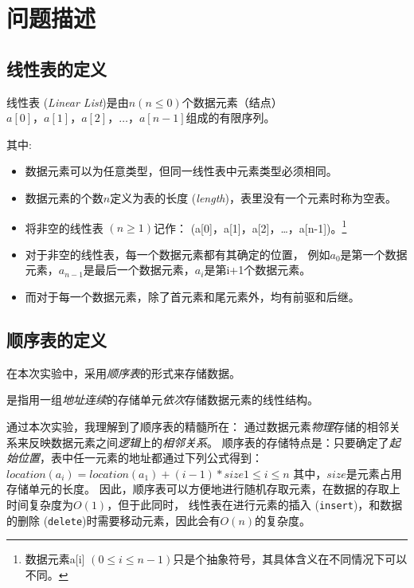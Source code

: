 \section{问题描述}
\subsection{线性表的定义}
\begin{definition}\label{def:linear list}
    线性表 (\emph{Linear List})是由$n (n \le 0)$个数据元素（结点）$a[0]，a[1]，a[2]，\dots ，a[n-1]$组成的有限序列。
\end{definition}
其中:
\begin{itemize}
    \item 数据元素可以为任意类型，但同一线性表中元素类型必须相同。
    \item 数据元素的个数$n$定义为表的长度 (\emph{length})，表里没有一个元素时称为空表。
    \item 将非空的线性表 $(n \ge 1)$记作： (a[0]，a[1]，a[2]，\dots ，a[n-1])。\footnote{数据元素a[i] $(0\le i \le n-1)$只是个抽象符号，其具体含义在不同情况下可以不同。}
    \item 对于非空的线性表，每一个数据元素都有其确定的位置，
        例如$a_{0}$是第一个数据元素，$a_{n-1}$是最后一个数据元素，$a_i$是第i+1个数据元素。
    \item 而对于每一个数据元素，除了首元素和尾元素外，均有前驱和后继。
\end{itemize}
\subsection{顺序表的定义}
在本次实验中，采用\emph{顺序表}的形式来存储数据。
\begin{definition}\label{def:list}
    是指用一组\emph{地址连续}的存储单元\emph{依次}存储数据元素的线性结构。
\end{definition}
通过本次实验，我理解到了顺序表的精髓所在：
通过数据元素\emph{物理}存储的相邻关系来反映数据元素之间\emph{逻辑}上的\emph{相邻关系}。
\newline
顺序表的存储特点是：只要确定了\emph{起始位置}，表中任一元素的地址都通过下列公式得到：
$location(a_i) = location(a_1) + (i-1) * size 　1\le i\le n$ 其中，$size$是元素占用存储单元的长度。
因此，顺序表可以方便地进行随机存取元素，在数据的存取上时间复杂度为$O(1)$，但于此同时，
线性表在进行元素的插入 (\texttt{insert})，和数据的删除 (\texttt{delete})时需要移动元素，因此会有$O(n)$的复杂度。
